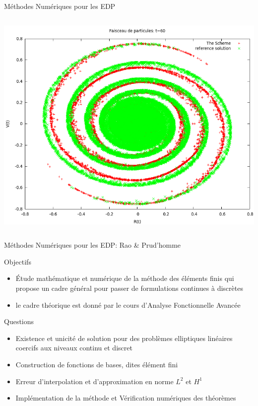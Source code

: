 \documentclass{beamer}
\begin{document}
\begin{frame}{M{\'e}thodes Num{\'e}riques pour les EDP}
\begin{columns}
    \centerline{\includegraphics[width=.9\linewidth]{hirstoaga.png}}
  \end{columns}




\end{frame}
\begin{frame}{Méthodes Numériques pour les EDP: Rao \& Prud'homme}
  \begin{block}{Objectifs}
    \begin{itemize}
    \item {\'E}tude math{\'e}matique et num{\'e}rique de la m{\'e}thode des {\'e}l{\'e}ments
      finis qui propose un cadre g{\'e}n{\'e}ral pour passer de formulations
      continues {\`a} discr{\`e}tes
    \item le cadre th{\'e}orique est donn{\'e} par le cours d'Analyse
      Fonctionnelle Avanc{\'e}e
    \end{itemize}
  \end{block}
  \begin{block}{Questions}
    \begin{itemize}
    \item Existence et unicit{\'e} de solution pour des probl{\`e}mes
      elliptiques lin{\'e}aires coercifs aux niveaux continu et discret
    \item Construction de fonctions de bases, dites {\'e}l{\'e}ment fini
    \item Erreur d'interpolation et d'approximation en norme $L^2$ et $H^1$
    \item Impl{\'e}mentation de la m{\'e}thode et V{\'e}rification num{\'e}riques des th{\'e}or{\`e}mes
    \end{itemize}
  \end{block}
\end{frame}
\end{document}

